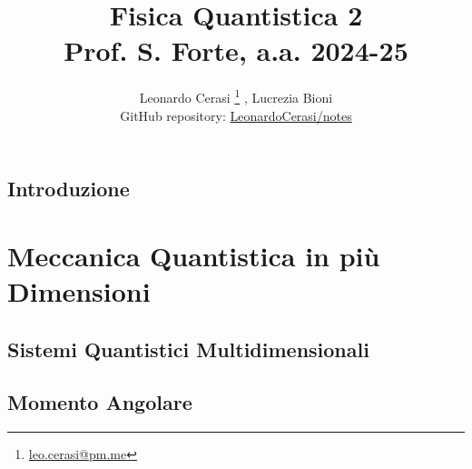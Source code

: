 \documentclass[a4paper, 12pt, openany]{book}
\author{Leonardo Cerasi%
	\thanks{\scriptsize\href{mailto:leonardo.cerasi@studenti.unimi.it}{leo.cerasi@pm.me}}%
	, Lucrezia Bioni\\
	\small GitHub repository: \href{https://github.com/LeonardoCerasi/notes}{LeonardoCerasi/notes}}
\title{\Huge\textbf{Fisica Quantistica 2} \\ \large Prof. S. Forte, a.a. 2024-25}
\begin{document}
\frontmatter

\maketitle
\tableofcontents

\mainmatter

\chapter*{Introduzione}


\part{Meccanica Quantistica in più Dimensioni}

\chapter{Sistemi Quantistici Multidimensionali}


\chapter{Momento Angolare}

\end{document}

